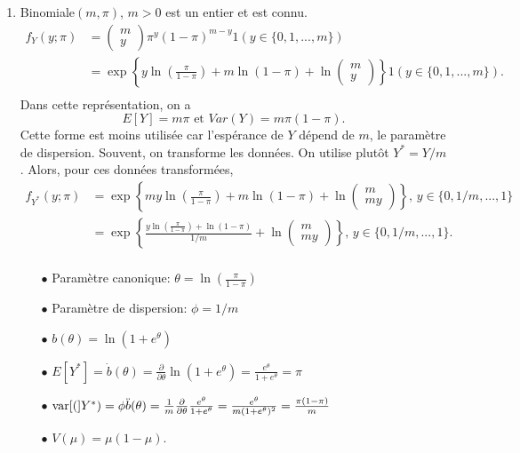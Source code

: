 \begin{solution}{5.1}
\begin{enumerate}
\item Binomiale$(m, \pi)$, $m>0$ est un entier et est connu.
\begin{align*}
f_{Y}(y;\pi)&=\begin{pmatrix} m\\y\end{pmatrix}\pi^{y}(1-\pi)^{m-y}1(y \in \{0,1,...,m\})\\
&=\exp\left\{y\ln\left(\frac{\pi}{1-\pi}\right)+m\ln(1-\pi)+\ln\begin{pmatrix} m\\y\end{pmatrix}\right\}1(y \in \{0,1,...,m\}).\\
\end{align*}
Dans cette représentation, on a $$E[Y]=m\pi \mbox{ et } Var(Y)=m\pi(1-\pi).$$ Cette forme est moins utilisée car l'espérance de $Y$ dépend de $m$, le paramètre de dispersion. Souvent, on transforme les données. On utilise plutôt $Y^{*}=Y/m$. Alors, pour ces données transformées,
\begin{align*}
f_{Y^{*}}(y;\pi)&=\exp\left\{my\ln\left(\frac{\pi}{1-\pi}\right)+m\ln(1-\pi)+\ln\begin{pmatrix} m\\my\end{pmatrix}\right\}, \,y \in \{0,1/m,...,1\}\\
&=\exp\left\{\frac{y\ln\left(\frac{\pi}{1-\pi}\right)+\ln(1-\pi)}{1/m}+\ln\begin{pmatrix} m\\my\end{pmatrix}\right\}, \,y \in \{0,1/m,...,1\}.\\
\end{align*}
\begin{itemize}
\item[$\bullet$] Paramètre canonique: $\theta=\ln\left(\frac{\pi}{1-\pi}\right)$
\item[$\bullet$] Paramètre de dispersion:  $\phi=1/m$
\item[$\bullet$] $b(\theta)=\ln(1+e^{\theta})$
\item[$\bullet$] $E[Y^*]=\dot{b}(\theta)=\frac{\partial}{\partial\theta}\ln(1+e^{\theta})=\frac{e^{\theta}}{1+e^\theta}=\pi$
\item[$\bullet$] $\mathrm{var} [ ( ]Y^*)=\phi\ddot{b}(\theta)=\frac{1}{m}\frac{\partial}{\partial\theta}\frac{e^{\theta}}{1+e^\theta}=\frac{e^\theta}{m(1+e^\theta)^2}=\frac{\pi(1-\pi)}{m}$
\item[$\bullet$] $V(\mu)=\mu(1-\mu)$.
\end{itemize}


\end{enumerate}
\end{solution}
